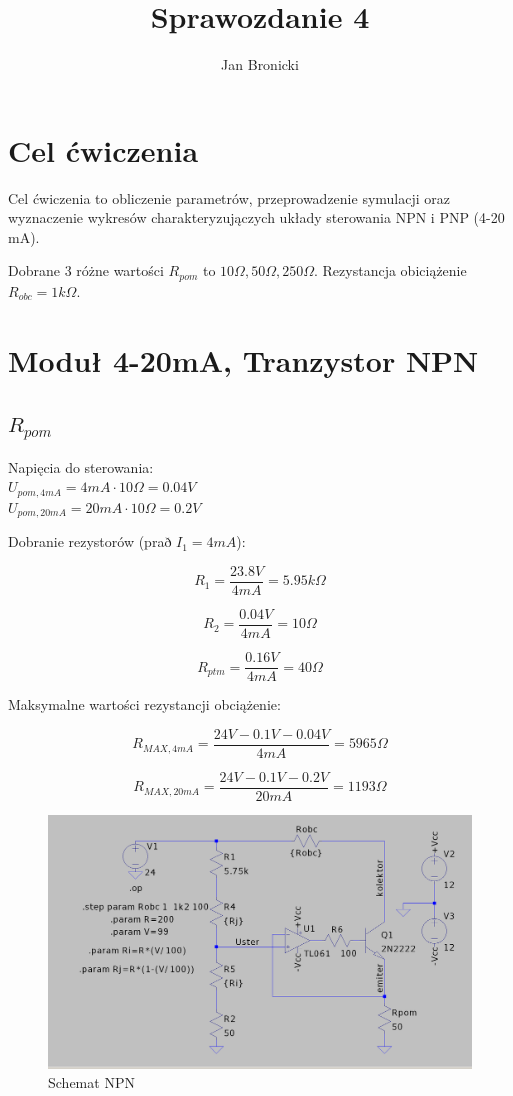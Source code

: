 \documentclass{article}
\title{Sprawozdanie 4}
\author{Jan Bronicki}
\date{}
\begin{document}
\maketitle

\section{Cel ćwiczenia}

Cel ćwiczenia to obliczenie parametrów, przeprowadzenie symulacji oraz wyznaczenie wykresów charakteryzujączych układy sterowania NPN i PNP (4-20 mA).

Dobrane 3 różne wartości $R_{pom}$ to $10\Omega, 50\Omega, 250\Omega$.
Rezystancja obiciążenie $R_{obc}=1k\Omega$.

\section{Moduł 4-20mA, Tranzystor NPN}

\subsection{$R_{pom}$}

Napięcia do sterowania:\\
$U_{pom, 4mA}=4mA\cdot 10\Omega=0.04V$\\
$U_{pom, 20mA}=20mA\cdot 10\Omega=0.2V$


Dobranie rezystorów (prað $I_{1}=4mA$):

$$
    R_{1}=\frac{23.8V}{4mA}=5.95k\Omega
$$

$$
    R_{2}=\frac{0.04V}{4mA}=10\Omega
$$


$$
    R_{ptm}=\frac{0.16V}{4mA}=40\Omega
$$


Maksymalne wartości rezystancji obciążenie:

$$
    R_{MAX, 4mA}=\frac{24V-0.1V-0.04V}{4mA}=5965\Omega
$$

$$
    R_{MAX, 20mA}=\frac{24V-0.1V-0.2V}{20mA}=1193\Omega
$$

\newpage

\begin{figure}[h!]
    \includegraphics[scale=0.2]{schemat1.png}
    \centering
    \caption{Schemat NPN}
\end{figure}
\end{document}
